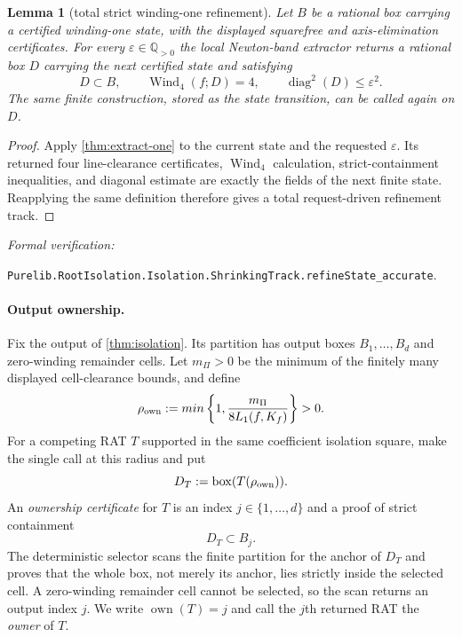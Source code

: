 \documentclass[11pt]{article}
\newtheorem{lemma}[theorem]{Lemma}
\newcommand{\Q}{\mathbb{Q}}
\newcommand{\Wind}{\operatorname{Wind}}
\newcommand{\diamq}{\operatorname{diag}^{2}}
\newcommand{\eps}{\varepsilon}
\newcommand{\leanref}[1]{\par\smallskip\noindent
  \emph{Formal verification:}\par\nobreak
  {\raggedright\nolinkurl{#1}.\par}}
\begin{document}
\begin{lemma}[total strict winding-one refinement]
\label{lem:track-refinement}
Let $B$ be a rational box carrying a certified winding-one state, with the
displayed squarefree and axis-elimination certificates.  For every
$\eps\in\Q_{>0}$ the local
Newton-band extractor returns a rational box $D$ carrying the next certified
state and satisfying
\[
 D\subset B,\qquad \Wind_4(f;D)=4,
 \qquad \diamq(D)\le\eps^2.
\]
The same finite construction, stored as the state transition, can be called
again on $D$.
\end{lemma}

\begin{proof}
Apply \cref{thm:extract-one} to the current state and the requested
$\eps$.  Its returned four line-clearance certificates, $\Wind_4$
calculation, strict-containment inequalities, and diagonal estimate are
exactly the fields of the next finite state.  Reapplying the same definition
therefore gives a total request-driven refinement track.
\end{proof}

\leanref{Purelib.RootIsolation.Isolation.ShrinkingTrack.refineState_accurate}

\paragraph{Output ownership.}
Fix the output of \cref{thm:isolation}.  Its partition has output boxes
$B_1,\ldots,B_d$ and zero-winding remainder cells.  Let $m_{\Pi}>0$ be the
minimum of the finitely many displayed cell-clearance bounds, and define
\[
 \rho_{\rm own}:=min\left\{1,\frac{m_{\Pi}}{8L_1(f,K_f)}\right\}>0.
\]
For a competing RAT $T$ supported in the same coefficient isolation square,
make the single call at this radius and put
\[
                 D_T:=\operatorname{box}(T(\rho_{\rm own})).
\]
An \emph{ownership certificate} for $T$ is an index
$j\in\{1,\ldots,d\}$ and a proof of strict containment
\[
                              D_T\subset B_j.
\]
The deterministic selector scans the finite partition for the anchor of
$D_T$ and proves that the whole box, not merely its anchor, lies strictly
inside the selected cell.  A zero-winding remainder cell cannot be selected,
so the scan returns an output index $j$.  We write
$\operatorname{own}(T)=j$ and call the $j$th returned RAT the \emph{owner} of
$T$.
\end{document}
